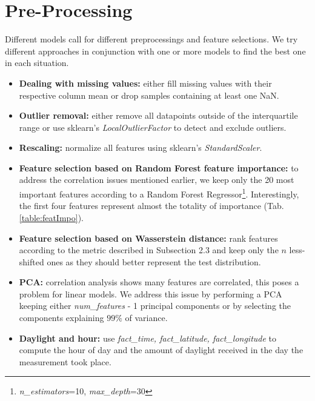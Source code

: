 \documentclass{article}
\begin{document}
\section{Pre-Processing}
Different models call for different preprocessings and feature selections. We try different approaches in conjunction with one or more models to find the best one in each situation.
\begin{itemize}
    \item \textbf{Dealing with missing values:} either fill missing values with their respective column mean or drop samples containing at least one NaN.
    \item \textbf{Outlier removal:} either remove all datapoints outside of the interquartile range or use sklearn's \textit{LocalOutlierFactor} to detect and exclude outliers.
    \item \textbf{Rescaling:} normalize all features using sklearn's \textit{StandardScaler}.
    \item \textbf{Feature selection based on Random Forest feature importance:} to address the correlation issues mentioned earlier, we keep only the 20 most important features according to a Random Forest Regressor\footnote{\textit{n\_estimators}=10, \textit{max\_depth}=30}. Interestingly, the first four features represent almost the totality of importance (Tab. \ref{table:featImpo}).
    
    \item \textbf{Feature selection based on Wasserstein distance:} rank features according to the metric described in Subsection 2.3 and keep only the $n$ less-shifted ones as they should better represent the test distribution.
    \item \textbf{PCA:} correlation analysis shows many features are correlated, this poses a problem for linear models. We address this issue by performing a PCA keeping either \textit{num\_features} - 1 principal components or by selecting the components explaining $99\%$ of variance.
    \item \textbf{Daylight and hour:} use \textit{fact\_time, fact\_latitude, fact\_longitude} to compute the hour of day and the amount of daylight received in the day the measurement took place.
\end{itemize}
\end{document}
